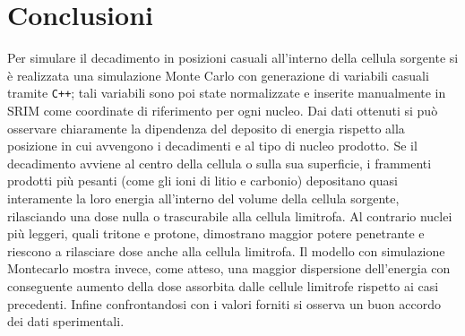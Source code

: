 \documentclass[a4paper,12pt]{article}
\begin{document}
    \section{Conclusioni}
    Per simulare il decadimento in posizioni casuali all'interno della cellula sorgente si è realizzata una simulazione Monte Carlo con generazione di variabili casuali tramite \texttt{C++}; tali variabili sono poi state normalizzate e inserite manualmente in SRIM come coordinate di riferimento per ogni nucleo. 
    Dai dati ottenuti si può osservare chiaramente la dipendenza del deposito di energia rispetto alla posizione in cui avvengono i decadimenti e al tipo di nucleo prodotto. 
    Se il decadimento avviene al centro della cellula o sulla sua superficie, i frammenti prodotti più pesanti (come gli ioni di litio e carbonio) depositano quasi interamente la loro energia all'interno del volume della cellula sorgente, rilasciando una dose nulla o trascurabile alla cellula limitrofa. Al contrario nuclei più leggeri, quali tritone e protone, dimostrano maggior potere penetrante e riescono a rilasciare dose anche alla cellula limitrofa.
    Il modello con simulazione Montecarlo mostra invece, come atteso, una maggior dispersione dell'energia con conseguente aumento della dose assorbita dalle cellule limitrofe rispetto ai casi precedenti.
    Infine confrontandosi con i valori forniti si osserva un buon accordo dei dati sperimentali.
\end{document}
